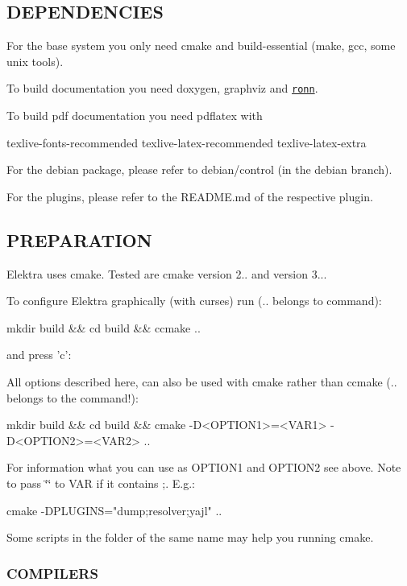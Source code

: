 \subsection*{D\+E\+P\+E\+N\+D\+E\+N\+C\+I\+E\+S}

For the base system you only need cmake and build-\/essential (make, gcc, some unix tools).

To build documentation you need doxygen, graphviz and \href{https://github.com/rtomayko/ronn/blob/master/INSTALLING#files}{\tt ronn}.

To build pdf documentation you need pdflatex with \begin{DoxyVerb}    texlive-fonts-recommended
    texlive-latex-recommended
    texlive-latex-extra
\end{DoxyVerb}


For the debian package, please refer to debian/control (in the debian branch).

For the plugins, please refer to the R\+E\+A\+D\+M\+E.\+md of the respective plugin.

\subsection*{P\+R\+E\+P\+A\+R\+A\+T\+I\+O\+N}

Elektra uses cmake. Tested are cmake version 2.. and version 3...

To configure Elektra graphically (with curses) run (.. belongs to command)\+: \begin{DoxyVerb}    mkdir build && cd build && ccmake ..
\end{DoxyVerb}


and press 'c'\+:

All options described here, can also be used with cmake rather than ccmake (.. belongs to the command!)\+: \begin{DoxyVerb}    mkdir build && cd build && cmake -D<OPTION1>=<VAR1> -D<OPTION2>=<VAR2> ..
\end{DoxyVerb}


For information what you can use as O\+P\+T\+I\+O\+N1 and O\+P\+T\+I\+O\+N2 see above. Note to pass \char`\"{}\char`\"{} to V\+A\+R if it contains ;. E.\+g.\+: \begin{DoxyVerb}    cmake -DPLUGINS="dump;resolver;yajl" ..
\end{DoxyVerb}


Some scripts in the folder of the same name may help you running cmake.

\subsubsection*{C\+O\+M\+P\+I\+L\+E\+R\+S}

